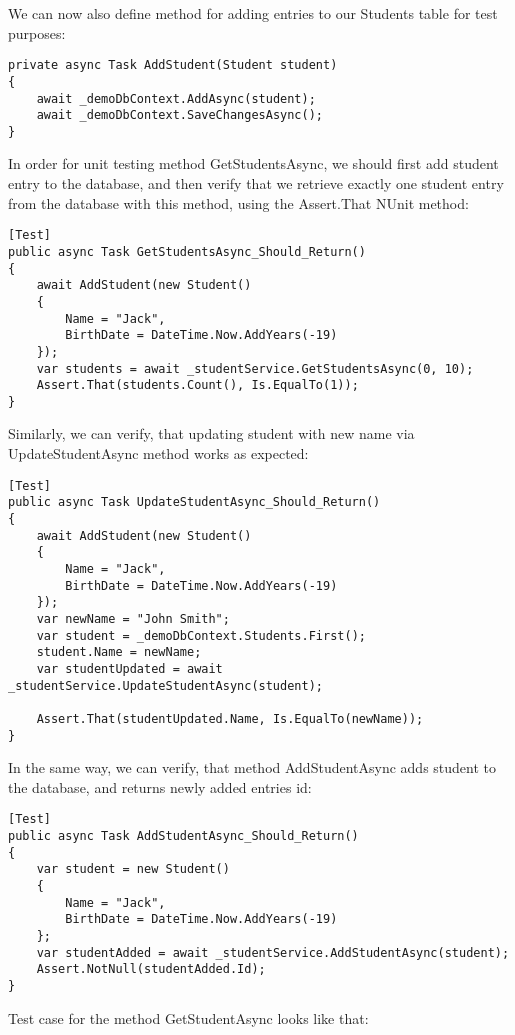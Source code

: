 We can now also define method for adding entries to our Students table for test purposes:

\begin{lstlisting}
private async Task AddStudent(Student student)
{
    await _demoDbContext.AddAsync(student);
    await _demoDbContext.SaveChangesAsync();
}
\end{lstlisting}

In order for unit testing method GetStudentsAsync, we should first add student entry to the database, and then verify that we retrieve exactly one student entry from the database with this method, using the Assert.That NUnit method:

\begin{lstlisting}
[Test]
public async Task GetStudentsAsync_Should_Return()
{
    await AddStudent(new Student()
    {
        Name = "Jack",
        BirthDate = DateTime.Now.AddYears(-19)
    });
    var students = await _studentService.GetStudentsAsync(0, 10);
    Assert.That(students.Count(), Is.EqualTo(1));
}
\end{lstlisting}

Similarly, we can verify, that updating student with new name via UpdateStudentAsync method works as expected:

\begin{lstlisting}
[Test]
public async Task UpdateStudentAsync_Should_Return()
{
    await AddStudent(new Student()
    {
        Name = "Jack",
        BirthDate = DateTime.Now.AddYears(-19)
    });
    var newName = "John Smith";
    var student = _demoDbContext.Students.First();
    student.Name = newName;
    var studentUpdated = await _studentService.UpdateStudentAsync(student);

    Assert.That(studentUpdated.Name, Is.EqualTo(newName));
}
\end{lstlisting}

In the same way, we can verify, that method AddStudentAsync adds student to the database, and returns newly added entries id:

\begin{lstlisting}
[Test]
public async Task AddStudentAsync_Should_Return()
{
    var student = new Student()
    {
        Name = "Jack",
        BirthDate = DateTime.Now.AddYears(-19)
    };
    var studentAdded = await _studentService.AddStudentAsync(student);
    Assert.NotNull(studentAdded.Id);
}
\end{lstlisting}

Test case for the method GetStudentAsync looks like that:

